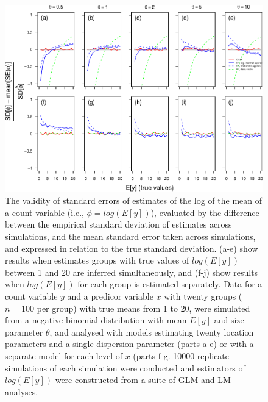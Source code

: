 \documentclass[]{article}
\begin{document}
\begin{figure}[h]

{\centering \includegraphics{revisiting_count_data_advice_files/figure-latex/SEPerformanceFigureLogRelative-1} 

}

\caption{The validity of standard errors of estimates of the log of the mean of a count variable (i.e., $\phi=log(E[y])$), evaluated by the difference between the empirical standard deviation of estimates across simulations, and the mean standard error taken across simulations, and expressed in relation to the true standard deviation.  (a-e) show results when estimates groups with true values of $log(E[y])$ between 1 and 20 are inferred simultaneously, and (f-j) show results when $log(E[y])$ for each group is estimated separately. Data for a count variable $y$ and a predicor variable $x$ with twenty groups ($n=100$ per group) with true means from 1 to 20, were simulated from a negative binomial distribution with mean $E[y]$ and size parameter $\theta$, and analysed with models estimating twenty location parameters and a single dispersion parameter (parts a-e) or with a separate model for each level of $x$ (parts f-g. 10000 replicate simulations of each simulation were conducted and estimators of $log(E[y])$ were constructed from a suite of GLM and LM analyses.}\label{fig:SEPerformanceFigureLogRelative}
\end{figure}
\end{document}
